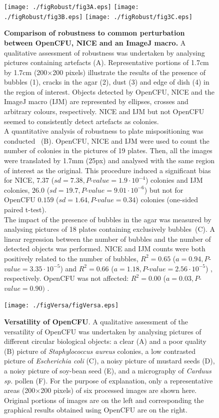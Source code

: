 \documentclass[10pt]{article}
\newcommand{\sa}{\emph{Staphylococcus aureus}}
\newcommand{\IJM}{IJM}
\newcommand{\EdgeNoiseOCFU}{$0.159$ ($sd=1.64, P$-$value=0.34$)}
\newcommand{\EdgeNoiseIJM}{$26.0$ ($sd=19.7, P$-$value=9.01\cdot 10^{-6}$)}
\newcommand{\EdgeNoiseNICE}{$7.37$ ($sd=7.38,P$-$value=1.9\cdot 10^{-4}$)}
\newcommand{\BubbleNoiseOCFU}{$R^2 = 0.00$ ($a=0.03, P$-$value=0.90)$ }
\newcommand{\BubbleNoiseNICE}{$R^2 = 0.65$ ($a=0.94, P$-$value=3.35\cdot 10^{-5}$) }
\newcommand{\BubbleNoiseIJM}{$R^2 = 0.66$ ($a=1.18, P$-$value=2.56\cdot 10^{-5}$) }
\begin{document}
\begin{figure}[!ht]
\begin{center}
\texttt{[image: ./figRobust/fig3A.eps]}
\texttt{[image: ./figRobust/fig3B.eps]}
\texttt{[image: ./figRobust/fig3C.eps]}
\end{center}

\caption{{\bf Comparison of robustness to common perturbation between OpenCFU, 
NICE\cite{clarke_lowcost_2010} and an ImageJ macro\cite{cai_optimized_2011}.} 
A qualitative assessment of robustness was undertaken by analysing pictures
containing artefacts (A).
Representative portions of 1.7cm by 1.7cm (200$\times{}$200 pixels) illustrate
the results of the presence of bubbles (1), cracks in the agar (2), dust (3) and
edge of dish (4) in the region of interest. Objects detected by OpenCFU, NICE
and the ImageJ macro (\IJM) are represented by ellipses, crosses and arbitrary
colours, respectively.
NICE and \IJM{} but not OpenCFU seemed to consistently detect artefacts as
colonies.\\
A quantitative analysis of robustness to plate mispositioning was
conducted ~(B).
OpenCFU, NICE and \IJM{} were used to count the number of colonies in the
pictures of 19 plates. Then, all the images were translated by 1.7mm (25px) and
analysed with the same region of interest as the original.
This procedure induced a significant bias for NICE, \EdgeNoiseNICE{} colonies and \IJM{} colonies,
\EdgeNoiseIJM{} but not for OpenCFU \EdgeNoiseOCFU{} colonies (one-sided paired
t-test).\\
The impact of the presence of bubbles in the agar was measured by analysing
pictures of 18 plates containing exclusively bubbles~(C).
A linear regression between the number of bubbles and the number of detected
objects was performed.
NICE and \IJM{} counts were both positively related to the number of bubbles,
\BubbleNoiseNICE{} and \BubbleNoiseIJM{}, respectively. OpenCFU was not affected:
\BubbleNoiseOCFU{}.
}
\label{figRobust}
\end{figure}

\newpage{}


\begin{figure}[!ht]

\begin{center}
\texttt{[image: ./figVersa/figVersa.eps]}
\end{center}

\caption{{\bf Versatility of OpenCFU}.
A qualitative assessment of the versatility of OpenCFU was undertaken by 
analysing pictures of different circular biological objects:
a clear (A) and a poor quality (B) picture of \sa{} colonies,
a low contrasted picture of \emph{Escherichia coli} (C),
a noisy picture of mustard seeds (D),
a noisy picture of soy-bean seed (E),
and a micrography of \emph{Carduus sp.} pollen (F).
For the purpose of explanation, only a representative areas (200$\times{}$200 pixels)
of six processed images are shown here.
Original portions of images are on the left and corresponding 
the graphical results obtained using OpenCFU are on the right.
}
\label{figVersat}
\end{figure}
\end{document}
